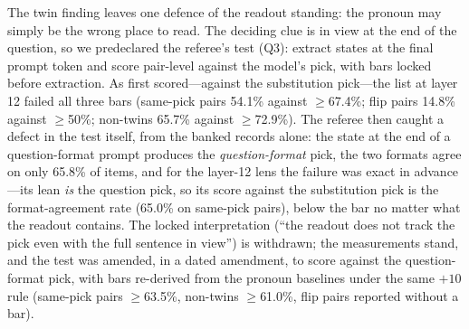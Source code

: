 \documentclass[11pt]{article}
\begin{document}
The twin finding leaves one defence of the readout standing: the pronoun may simply be the wrong place to read. The deciding clue is in view at the end of the question, so we predeclared the referee's test (Q3): extract states at the final prompt token and score pair-level against the model's pick, with bars locked before extraction. As first scored---against the substitution pick---the list at layer 12 failed all three bars (same-pick pairs 54.1\% against $\ge$67.4\%; flip pairs 14.8\% against $\ge$50\%; non-twins 65.7\% against $\ge$72.9\%). The referee then caught a defect in the test itself, from the banked records alone: the state at the end of a question-format prompt produces the \emph{question-format} pick, the two formats agree on only 65.8\% of items, and for the layer-12 lens the failure was exact in advance---its lean \emph{is} the question pick, so its score against the substitution pick is the format-agreement rate (65.0\% on same-pick pairs), below the bar no matter what the readout contains. The locked interpretation (``the readout does not track the pick even with the full sentence in view'') is withdrawn; the measurements stand, and the test was amended, in a dated amendment, to score against the question-format pick, with bars re-derived from the pronoun baselines under the same $+10$ rule (same-pick pairs $\ge$63.5\%, non-twins $\ge$61.0\%, flip pairs reported without a bar).
\end{document}
